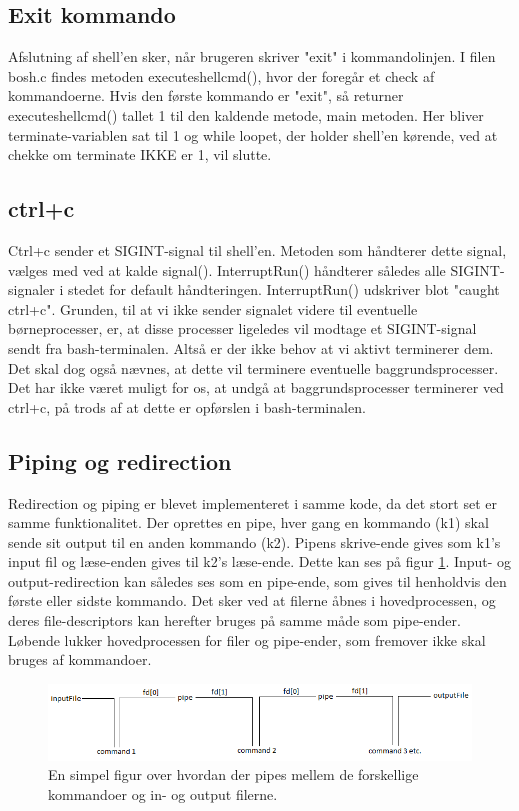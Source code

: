 \subsection{Exit kommando}
Afslutning af shell'en sker, når brugeren skriver "exit" i kommandolinjen. I filen bosh.c findes metoden executeshellcmd(), hvor der foregår et check af kommandoerne. Hvis den første kommando er "exit", så returner executeshellcmd() tallet 1 til den kaldende metode, main metoden. Her bliver terminate-variablen sat til 1 og while loopet, der holder shell'en kørende, ved at chekke om terminate IKKE er 1, vil slutte.

\subsection{ctrl+c}
Ctrl+c sender et SIGINT-signal til shell'en. Metoden som håndterer dette signal, vælges med ved at kalde signal(). InterruptRun() håndterer således alle SIGINT-signaler i stedet for default håndteringen. InterruptRun() udskriver blot "caught ctrl+c". Grunden, til at vi ikke sender signalet videre til eventuelle børneprocesser, er, at disse processer ligeledes vil modtage et SIGINT-signal sendt fra bash-terminalen. Altså er der ikke behov at vi aktivt terminerer dem. Det skal dog også nævnes, at dette vil terminere eventuelle baggrundsprocesser. 
Det har ikke været muligt for os, at undgå at baggrundsprocesser terminerer ved ctrl+c, på trods af at dette er opførslen i bash-terminalen.

\subsection{Piping og redirection}
\label{subsec:pipe_redirect}
Redirection og piping er blevet implementeret i samme kode, da det stort set er samme funktionalitet.
Der oprettes en pipe, hver gang en kommando (k1) skal sende sit output til en anden kommando (k2). Pipens skrive-ende gives som k1's input fil og læse-enden gives til k2's læse-ende. Dette kan ses på figur \ref{fig:pipe}. Input- og output-redirection kan således ses som en pipe-ende, som gives til henholdvis den første eller sidste kommando. Det sker ved at filerne åbnes i hovedprocessen, og deres file-descriptors kan herefter bruges på samme måde som pipe-ender. Løbende lukker hovedprocessen for filer og pipe-ender, som fremover ikke skal bruges af kommandoer.


\vspace{1cm}
\begin{figure}[h]
\includegraphics[scale=0.7, trim= 2cm 0cm 0cm 0cm]{pipefig}
\caption{En simpel figur over hvordan der pipes mellem de forskellige kommandoer og in- og output filerne.}
\label{fig:pipe}
\end{figure}
\vspace{1cm}

